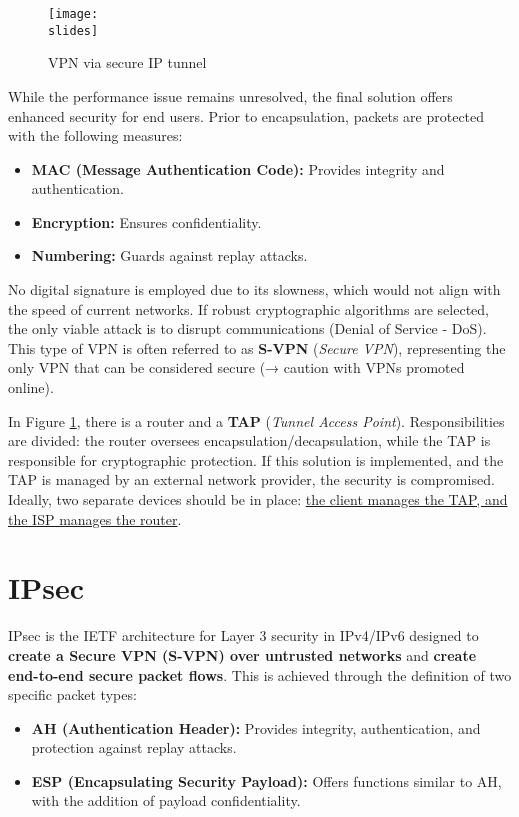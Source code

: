 \begin{figure}[h]
    \centering
    \texttt{[image: \\slides]}
    \caption{VPN via secure IP tunnel}
    \label{fig:vpn-secure-ip}
\end{figure}

While the performance issue remains unresolved, the final solution offers enhanced security for end users. Prior to encapsulation, packets are protected with the following measures:
\begin{itemize}
    \item \textbf{MAC (Message Authentication Code):} Provides integrity and authentication.
    \item \textbf{Encryption:} Ensures confidentiality.
    \item \textbf{Numbering:} Guards against replay attacks.
\end{itemize}

No digital signature is employed due to its slowness, which would not align with the speed of current networks. If robust cryptographic algorithms are selected, the only viable attack is to disrupt communications (Denial of Service - DoS). This type of VPN is often referred to as \textbf{S-VPN} (\textit{Secure VPN}), representing the only VPN that can be considered secure (→ caution with VPNs promoted online).

In Figure \ref*{fig:vpn-secure-ip}, there is a router and a \textbf{TAP} (\textit{Tunnel Access Point}). Responsibilities are divided: the router oversees encapsulation/decapsulation, while the TAP is responsible for cryptographic protection. If this solution is implemented, and the TAP is managed by an external network provider, the security is compromised. Ideally, two separate devices should be in place: \ul{the client manages the TAP, and the ISP manages the router}.

\section{IPsec}

IPsec is the IETF architecture for Layer 3 security in IPv4/IPv6 designed to \textbf{create a Secure VPN (S-VPN) over untrusted networks} and \textbf{create end-to-end secure packet flows}. This is achieved through the definition of two specific packet types:

\begin{itemize}
    \item \textbf{AH (Authentication Header):}
          Provides integrity, authentication, and protection against replay attacks.
    \item \textbf{ESP (Encapsulating Security Payload):}
          Offers functions similar to AH, with the addition of payload confidentiality.
\end{itemize}

